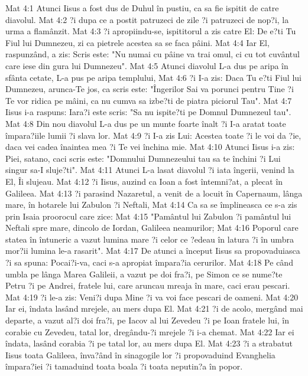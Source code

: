 Mat 4:1  Atunci Iisus a fost dus de Duhul în pustiu, ca sa fie ispitit de catre diavolul.
Mat 4:2  ?i dupa ce a postit patruzeci de zile ?i patruzeci de nop?i, la urma a flamânzit.
Mat 4:3  ?i apropiindu-se, ispititorul a zis catre El: De e?ti Tu Fiul lui Dumnezeu, zi ca pietrele acestea sa se faca pâini.
Mat 4:4  Iar El, raspunzând, a zis: Scris este: "Nu numai cu pâine va trai omul, ci cu tot cuvântul care iese din gura lui Dumnezeu".
Mat 4:5  Atunci diavolul L-a dus pe aripa în sfânta cetate, L-a pus pe aripa templului,
Mat 4:6  ?i I-a zis: Daca Tu e?ti Fiul lui Dumnezeu, arunca-Te jos, ca scris este: "Îngerilor Sai va porunci pentru Tine ?i Te vor ridica pe mâini, ca nu cumva sa izbe?ti de piatra piciorul Tau".
Mat 4:7  Iisus i-a raspuns: Iara?i este scris: "Sa nu ispite?ti pe Domnul Dumnezeul tau".
Mat 4:8  Din nou diavolul L-a dus pe un munte foarte înalt ?i I-a aratat toate împara?iile lumii ?i slava lor.
Mat 4:9  ?i I-a zis Lui: Acestea toate ?i le voi da ?ie, daca vei cadea înaintea mea ?i Te vei închina mie.
Mat 4:10  Atunci Iisus i-a zis: Piei, satano, caci scris este: "Domnului Dumnezeului tau sa te închini ?i Lui singur sa-I sluje?ti".
Mat 4:11  Atunci L-a lasat diavolul ?i iata îngerii, venind la El, Îi slujeau.
Mat 4:12  ?i Iisus, auzind ca Ioan a fost întemni?at, a plecat în Galileea.
Mat 4:13  ?i parasind Nazaretul, a venit de a locuit în Capernaum, lânga mare, în hotarele lui Zabulon ?i Neftali,
Mat 4:14  Ca sa se împlineasca ce s-a zis prin Isaia proorocul care zice:
Mat 4:15  "Pamântul lui Zabulon ?i pamântul lui Neftali spre mare, dincolo de Iordan, Galileea neamurilor;
Mat 4:16  Poporul care statea în întuneric a vazut lumina mare ?i celor ce ?edeau în latura ?i în umbra mor?ii lumina le-a rasarit".
Mat 4:17  De atunci a început Iisus sa propovaduiasca ?i sa spuna: Pocai?i-va, caci s-a apropiat împara?ia cerurilor.
Mat 4:18  Pe când umbla pe lânga Marea Galileii, a vazut pe doi fra?i, pe Simon ce se nume?te Petru ?i pe Andrei, fratele lui, care aruncau mreaja în mare, caci erau pescari.
Mat 4:19  ?i le-a zis: Veni?i dupa Mine ?i va voi face pescari de oameni.
Mat 4:20  Iar ei, îndata lasând mrejele, au mers dupa El.
Mat 4:21  ?i de acolo, mergând mai departe, a vazut al?i doi fra?i, pe Iacov al lui Zevedeu ?i pe Ioan fratele lui, în corabie cu Zevedeu, tatal lor, dregându-?i mrejele ?i i-a chemat.
Mat 4:22  Iar ei îndata, lasând corabia ?i pe tatal lor, au mers dupa El.
Mat 4:23  ?i a strabatut Iisus toata Galileea, înva?ând în sinagogile lor ?i propovaduind Evanghelia împara?iei ?i tamaduind toata boala ?i toata neputin?a în popor.
